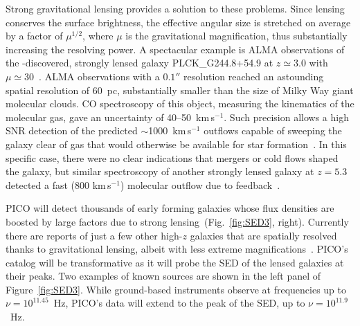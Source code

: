 \documentclass[PICOReport.tex]{subfiles}
\begin{document}
Strong gravitational lensing provides a solution to these problems. Since lensing conserves the surface brightness, the effective angular size is stretched on average by a factor of $\mu^{1/2}$, where $\mu$ is the gravitational magnification, thus substantially increasing the resolving power. A spectacular example is ALMA observations of the \planck-discovered, strongly lensed galaxy PLCK\_G244.8\-+54.9 at $z \simeq 3.0$  with $\mu \simeq 30$~\citep{Canameras2017ALMA}. ALMA observations with a $0.1''$ resolution reached an astounding spatial resolution of 60~pc, substantially smaller than the size of Milky Way giant molecular clouds. CO spectroscopy of this object, measuring the kinematics of the molecular gas, gave an uncertainty of 40--50~km\,s$^{-1}$. Such precision allows a high \ac{SNR} detection of the predicted $\sim$1000~km\,s$^{-1}$ outflows capable of sweeping the galaxy clear of gas that would otherwise be available for star formation~\citep{KingPounds2015}. In this specific case, there were no clear indications that mergers or cold flows shaped the galaxy, but similar spectroscopy of another strongly lensed galaxy at $z=5.3$ detected a fast (800 km\,s$^{-1}$) molecular outflow due to feedback~\citep{spilker2018}. 



PICO will detect thousands of early forming galaxies whose flux densities are boosted by large factors due to strong lensing~(Fig.~\ref{fig:SED3}, right). Currently there are reports of just a few other high-$z$ galaxies that are spatially resolved thanks to gravitational lensing, albeit with less extreme magnifications~\citep{Dye2018, Lamarche2018, Sharda2018}. PICO's catalog will be transformative as it will probe the \ac{SED} of the lensed galaxies at their peaks. Two examples of known sources are shown in the left panel of Figure~\ref{fig:SED3}. While ground-based instruments observe at frequencies up to $\nu = 10^{11.45}$~Hz,
PICO's data will extend to the peak of the \ac{SED}, up to $\nu = 10^{11.9}$~Hz.
\end{document}
